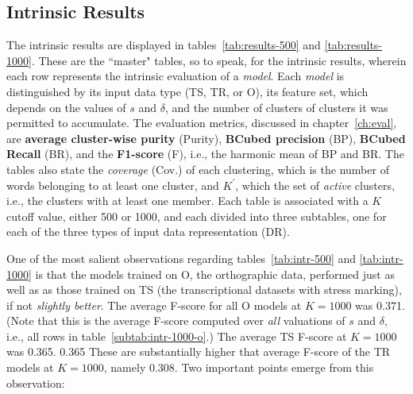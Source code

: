\subsection{Intrinsic Results}
	The intrinsic results are displayed in tables~\ref{tab:results-500} and \ref{tab:results-1000}. 
	These are the ``master" tables, so to speak, for the intrinsic results, wherein each row %
	represents the intrinsic evaluation of a \emph{model}. %
	Each \emph{model} is distinguished by its input data type (TS, TR, or O), its feature set, which depends 
	on the values of $s$ and $\delta$, and the number of clusters of clusters it was permitted to accumulate. 
	The evaluation metrics, discussed in chapter~\ref{ch:eval}, are \textbf{average cluster-wise purity} (Purity), 
	\textbf{BCubed precision} (BP), \textbf{BCubed Recall} (BR), 
	and the \textbf{F1-score} (F), i.e., the harmonic mean of BP and BR.  The tables also state the \emph{coverage} 
	(Cov.) of each clustering, which is the number of words belonging to at least one cluster, and $K^{\prime}$, 
	which the set of \emph{active} clusters, i.e., the clusters with at least one member. 
	Each table  is associated with a $K$ cutoff value, either 500 or 1000, and each divided into three subtables, 
	one for each of the three types of input data representation (DR).

One of the most salient observations regarding tables~\ref{tab:intr-500} and \ref{tab:intr-1000}
 is that the models trained on O, the orthographic data, performed just as well as as those trained on TS
  (the transcriptional datasets with stress marking), if not \emph{slightly better}. The average F-score for all O models 
 at $K=1000$ was 0.371. (Note that this is the average F-score computed over \emph{all} valuations of $s$
   and $\delta$, i.e., all rows in table~\ref{subtab:intr-1000-o}.) %
   The average TS F-score at $K=1000$ was 0.365. 
   0.365 %
   These are substantially higher that average F-score of the TR models at $K=1000$, namely 0.308.
  Two important points emerge from this observation: 

